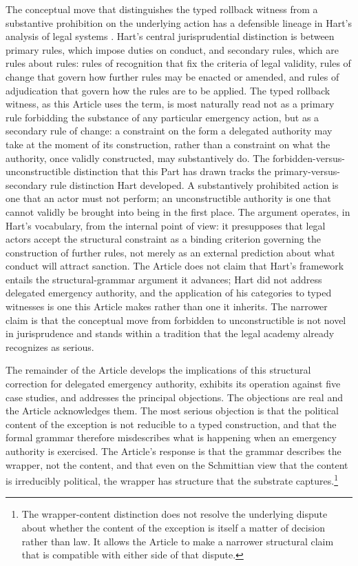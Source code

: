 The conceptual move that distinguishes the typed rollback witness from a substantive prohibition
on the underlying action has a defensible lineage in Hart's analysis of legal systems
\cite{ref_hart_concept_of_law}.
Hart's central jurisprudential distinction is between primary rules, which impose duties on conduct,
and secondary rules, which are rules about rules: rules of recognition that fix the criteria of legal
validity, rules of change that govern how further rules may be enacted or amended, and rules of
adjudication that govern how the rules are to be applied.
The typed rollback witness, as this Article uses the term, is most naturally read not as a primary rule
forbidding the substance of any particular emergency action, but as a secondary rule of change:
a constraint on the form a delegated authority may take at the moment of its construction,
rather than a constraint on what the authority, once validly constructed, may substantively do.
The forbidden-versus-unconstructible distinction that this Part has drawn tracks the primary-versus-secondary
rule distinction Hart developed.
A substantively prohibited action is one that an actor must not perform; an unconstructible authority is one
that cannot validly be brought into being in the first place.
The argument operates, in Hart's vocabulary, from the internal point of view: it presupposes that legal actors
accept the structural constraint as a binding criterion governing the construction of further rules,
not merely as an external prediction about what conduct will attract sanction.
The Article does not claim that Hart's framework entails the structural-grammar argument it advances;
Hart did not address delegated emergency authority, and the application of his categories to typed witnesses
is one this Article makes rather than one it inherits.
The narrower claim is that the conceptual move from forbidden to unconstructible is not novel in jurisprudence
and stands within a tradition that the legal academy already recognizes as serious.

The remainder of the Article develops the implications of this structural correction for delegated
emergency authority,
exhibits its operation against five case studies,
and addresses the principal objections.
The objections are real and the Article acknowledges them.
The most serious objection is that the political content of the exception is not reducible to a typed
construction,
and that the formal grammar therefore misdescribes what is happening when an emergency authority is exercised.
The Article's response is that the grammar describes the wrapper, not the content,
and that even on the Schmittian view that the content is irreducibly political,
the wrapper has structure that the substrate captures.\footnote{%
The wrapper-content distinction does not resolve the underlying dispute about whether the content of the
exception is itself a matter of decision rather than law.
It allows the Article to make a narrower structural claim that is compatible with either side of that dispute.}
